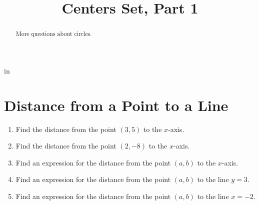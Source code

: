 \documentclass{ximera}
\title{Centers Set, Part 1}
\newcommand{\pskip}{\vskip 0.1 in}
\begin{document}
\begin{abstract}
More questions about circles.
\end{abstract}
\maketitle


\pskip

\section{Distance from a Point to a Line}

\begin{question} \label{Qpefrp3r}
\begin{enumerate}
\item Find the distance from the point $(3,5)$ to the $x$-axis.

\item Find the distance from the point $(2,-8)$ to the $x$-axis.

\item Find an expression for the distance from the point $(a,b)$ to the $x$-axis.

\item Find an expression for the distance from the point $(a,b)$ to the line $y=3$.

\item Find an expression for the distance from the point $(a,b)$ to the line $x=-2$.
\end{enumerate}
\end{question}
\end{document}
